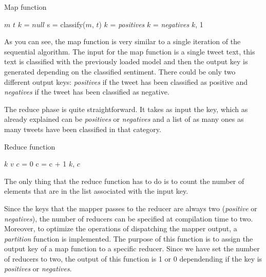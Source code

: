 \documentclass[10pt,twocolumn,letterpaper]{article}
\begin{document}
\begin{algorithm}[H]
\label{MapFunction}
\caption{Map function}
\begin{algorithmic}

    \State $m$ 
    \State $t$ 
    \State $k$ = $null$
    \State s = classify($m$, $t$)
        \State $k$ = \textit{positives}
    \Else
        \State $k$ = \textit{negatives}
    \EndIf
    \State \Return $k$, 1

\end{algorithmic}
\end{algorithm}

As you can see, the map function is very similar to a single iteration of the sequential algorithm. The input for the map function is a single tweet text, this text is classified with the previously loaded model and then the output key is generated depending on the classified sentiment. There could be only two different output keys: \textit{positives} if the tweet has been classified as positive and \textit{negatives} if the tweet has been classified as negative.

The reduce phase is quite straightforward. It takes as input the key, which as already explained can be \textit{positives} or \textit{negatives} and a list of as many ones as many tweets have been classified in that category.

\begin{algorithm}[H]
\label{ReduceFunction}
\caption{Reduce function}
\begin{algorithmic}

    \State $k$ 
    \State $v$ 
    \State $c$ = 0
        \State c = c + 1
    \EndFor
    \State \Return $k$, $c$

\end{algorithmic}
\end{algorithm}

The only thing that the reduce function has to do is to count the number of elements that are in the list associated with the input key.

Since the keys that the mapper passes to the reducer are always two (\textit{positive} or \textit{negatives}), the number of reducers can be specified at compilation time to two. Moreover, to optimize the operations of dispatching the mapper output, a \textit{partition} function is implemented. The purpose of this function is to assign the output key of a map function to a specific reducer. Since we have set the number of reducers to two, the output of this function is 1 or 0 dependending if the key is \textit{positives} or \textit{negatives}.
\end{document}
